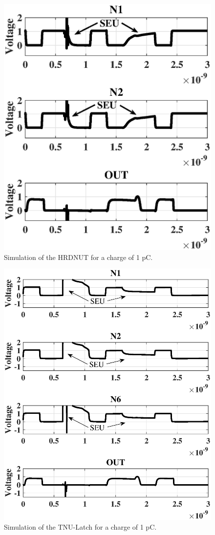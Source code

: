 \begin{figure}[!htbp]
	\centering
	\includegraphics[width=0.55\linewidth]{Figures/DNULargeCharge}
	\caption{Simulation of the HRDNUT for a charge of 1 pC.}
	\label{DNULarge_fig}
\end{figure}

\begin{figure}[!htbp]
	\centering
	\includegraphics[width=0.75\linewidth]{Figures/largechargetnu}
	\caption{Simulation of the TNU-Latch for a charge of 1 pC.}
	\label{TNULarge_fig}
\end{figure}

